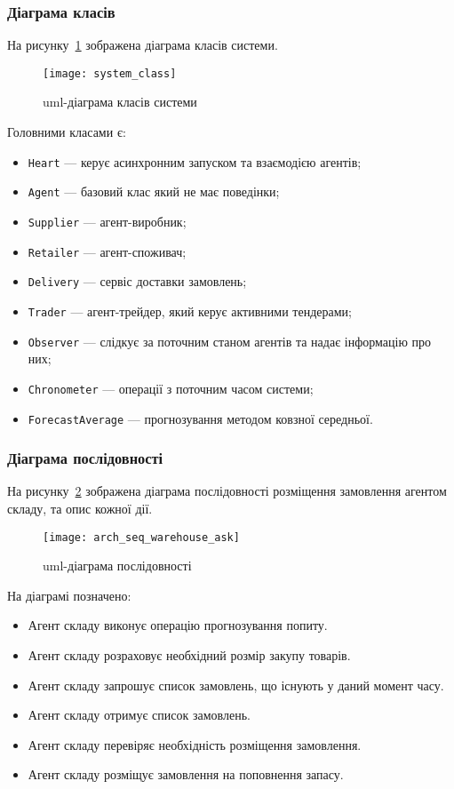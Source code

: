 \subsubsection{Діаграма класів}
На рисунку~\ref{fig:system_class} зображена діаграма класів системи.

\begin{figure}[H]
	\centering
	\texttt{[image: system\_class]}
	\caption{\acrshort{uml}-діаграма класів системи}
	\label{fig:system_class}
\end{figure} 

Головними класами є:
\begin{itemize}
	\item \texttt{Heart} --- керує асинхронним запуском та взаємодією агентів;
	\item \texttt{Agent} --- базовий клас який не має поведінки;
	\item \texttt{Supplier} --- агент-виробник;
	\item \texttt{Retailer} --- агент-споживач;
	\item \texttt{Delivery} --- сервіс доставки замовлень;
	\item \texttt{Trader} --- агент-трейдер, який керує активними тендерами;
	\item \texttt{Observer} --- слідкує за поточним станом агентів та надає інформацію про них;
	\item \texttt{Chronometer} --- операції з поточним часом системи;
	\item \texttt{ForecastAverage} --- прогнозування методом ковзної середньої.
\end{itemize}

\subsubsection{Діаграма послідовності}
На рисунку~\ref{fig:arch_seq_warehouse_ask} зображена діаграма послідовності розміщення замовлення агентом складу, та опис кожної дії.

\begin{figure}[H]
	\centering
	\texttt{[image: arch\_seq\_warehouse\_ask]}
	\caption{\acrshort{uml}-діаграма послідовності}
	\label{fig:arch_seq_warehouse_ask}
\end{figure} 

На діаграмі позначено:
\begin{itemize}
	\item Агент складу виконує операцію прогнозування попиту.
	\item Агент складу розраховує необхідний розмір закупу товарів.
	\item Агент складу запрошує список замовлень, що існують у даний момент часу.
	\item Агент складу отримує список замовлень.
	\item Агент складу перевіряє необхідність розміщення замовлення. 
	\item Агент складу розміщує замовлення на поповнення запасу.
\end{itemize}

